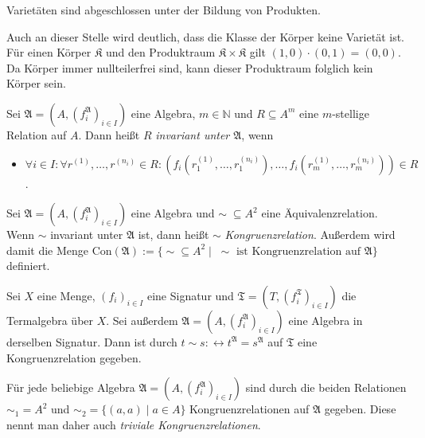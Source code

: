 \begin{corollary}\label{corollary:prod-varietaeten}
    Varietäten sind abgeschlossen unter der Bildung von Produkten.
\end{corollary}

\begin{remark}
    Auch an dieser Stelle wird deutlich, dass die Klasse der Körper keine Varietät ist. Für einen Körper $\mathfrak{K}$
    und den Produktraum $\mathfrak{K}\times \mathfrak{K}$ gilt $(1,0)\cdot (0,1)=(0,0)$. Da Körper immer nullteilerfrei sind,
    kann dieser Produktraum folglich kein Körper sein.
\end{remark}


\begin{definition}
    Sei $\mathfrak{A}=(A,(f^\mathfrak{A}_i)_{i\in I})$ eine Algebra, $m\in\mathbb{N}$ und $R\subseteq A^m$ eine $m$-stellige
    Relation auf $A$. Dann heißt $R$ \emph{invariant unter $\mathfrak{A}$}, wenn
    \begin{itemize}[topsep=0pt, label={--}]
        \item $\forall i\in I:\forall r^{(1)},\ldots,r^{(n_i)}\in R:(f_i(r_1^{(1)},\ldots,r_1^{(n_i)}),\ldots,f_i(r_m^{(1)},\ldots,r_m^{(n_i)}))\in R$.
    \end{itemize}
\end{definition}

\begin{definition}
    Sei $\mathfrak{A}=(A,(f^\mathfrak{A}_i)_{i\in I})$ eine Algebra und $\sim\;\subseteq A^2$ eine Äquivalenzrelation.
    Wenn $\sim$ invariant unter $\mathfrak{A}$ ist, dann heißt $\sim$ \emph{Kongruenzrelation}. Außerdem wird damit die Menge
    Con$(\mathfrak{A}):=\{\sim\subseteq A^2\mid \;\sim \text{ ist Kongruenzrelation auf }\mathfrak{A}\}$ definiert.
\end{definition}

\begin{example}
    Sei $X$ eine Menge, $(f_i)_{i\in I}$ eine Signatur und $\mathfrak{T}=(T,(f^\mathfrak{T}_i)_{i\in I})$ die Termalgebra über $X$.
    Sei außerdem $\mathfrak{A}=(A,(f^\mathfrak{A}_i)_{i\in I})$ eine Algebra in derselben Signatur. Dann ist durch
    $t\sim s:\leftrightarrow t^\mathfrak{A}=s^\mathfrak{A}$ auf $\mathfrak{T}$ eine Kongruenzrelation gegeben.
\end{example}

\begin{example}
    Für jede beliebige Algebra $\mathfrak{A}=(A,(f^\mathfrak{A}_i)_{i\in I})$ sind durch die beiden Relationen $\sim_1=A^2$ und $\sim_2=\{(a,a)\mid a\in A\}$
    Kongruenzrelationen auf $\mathfrak{A}$ gegeben. Diese nennt man daher auch \emph{triviale Kongruenzrelationen}.
\end{example}

